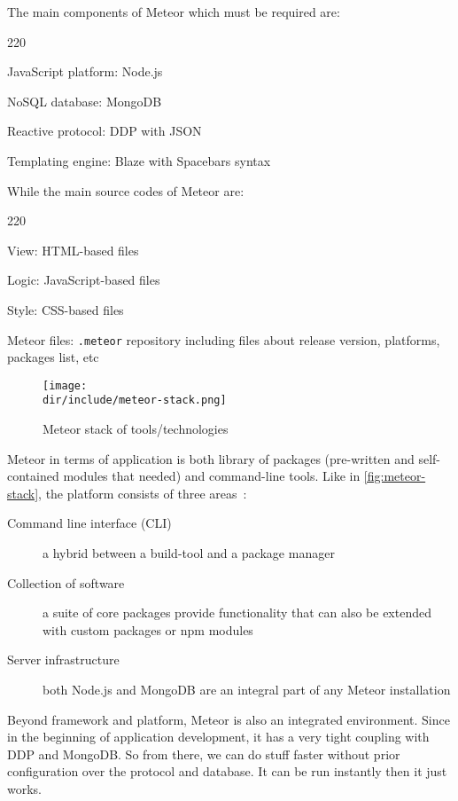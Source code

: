 The main components of Meteor which must be required are:

\begin{dinglist}{220}
\item JavaScript platform: Node.js
\item NoSQL database: MongoDB
\item Reactive protocol: \ac{DDP} with \ac{JSON}
\item Templating engine: Blaze with Spacebars syntax
\end{dinglist}

While the main source codes of Meteor are:

\begin{dinglist}{220}
\item View: HTML-based files
\item Logic: JavaScript-based files
\item Style: \ac{CSS}-based files
\item Meteor files: \verb|.meteor| repository including files about release version, platforms, packages list, etc
\end{dinglist}

\begin{figure}[htbp]
    \centering
    \texttt{[image: \\dir/include/meteor-stack.png]}
    \caption[Meteor Stack]{Meteor stack of tools/technologies}
    \label{fig:meteor-stack}
\end{figure}

Meteor in terms of application is both library of packages (pre-written and self-contained modules that needed) and command-line tools.
Like in \autoref{fig:meteor-stack}, the platform consists of three areas~\autocite{Hochhaus2014Meteor}:

\begin{description}
\item [Command line interface (CLI)] a hybrid between a build-tool and a package manager
\item [Collection of software] a suite of core packages provide functionality that can also be extended with custom packages or \ac{npm} modules
\item [Server infrastructure] both Node.js and MongoDB are an integral part of any Meteor installation
\end{description}

Beyond framework and platform, Meteor is also an integrated environment.
Since in the beginning of application development, it has a very tight coupling with \ac{DDP} and MongoDB.
So from there, we can do stuff faster without prior configuration over the protocol and database.
It can be run instantly then it just works.

